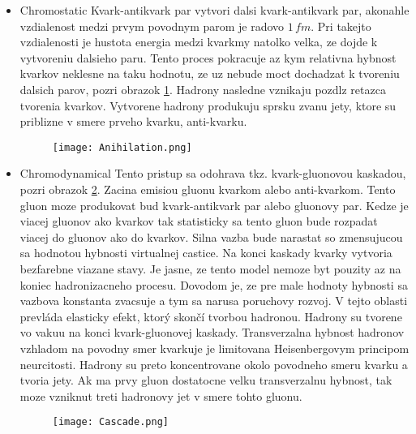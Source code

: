 \documentclass[../../main.tex]{subfiles}
\begin{document}
\begin{itemize}
	\item Chromostatic \newline
	Kvark-antikvark par vytvori dalsi kvark-antikvark par, akonahle vzdialenost medzi prvym povodnym parom je radovo $1\,fm$. Pri takejto vzdialenosti je hustota energia medzi kvarkmy natolko velka, ze dojde k vytvoreniu dalsieho paru. Tento proces pokracuje az kym relativna hybnost kvarkov neklesne na taku hodnotu, ze uz nebude moct dochadzat k tvoreniu dalsich parov, pozri obrazok \ref{sf1:fig:anihilation}. Hadrony nasledne vznikaju pozdlz retazca tvorenia kvarkov. Vytvorene hadrony produkuju sprsku zvanu jety, ktore su priblizne v smere prveho kvarku, anti-kvarku.
	\begin{figure}[!h]
	\centering
	\texttt{[image: Anihilation.png]}
	\caption{}
	\label{sf1:fig:anihilation}
	\end{figure}
	\item Chromodynamical \newline
	Tento pristup sa odohrava tkz. kvark-gluonovou kaskadou, pozri obrazok \ref{sf1:fig:cascade}. Zacina emisiou gluonu kvarkom alebo anti-kvarkom. Tento gluon moze produkovat bud kvark-antikvark par alebo gluonovy par. Kedze je viacej gluonov ako kvarkov tak statisticky sa tento gluon bude rozpadat viacej do gluonov ako do kvarkov. Silna vazba bude narastat so zmensujucou sa hodnotou hybnosti virtualnej castice. Na konci kaskady kvarky vytvoria bezfarebne viazane stavy. Je jasne, ze tento model nemoze byt pouzity az na koniec hadronizacneho procesu. Dovodom je, ze pre male hodnoty hybnosti sa vazbova konstanta zvacsuje a tym sa narusa poruchovy rozvoj. V tejto oblasti prevláda elasticky efekt, ktorý skončí tvorbou hadronou. Hadrony su tvorene vo vakuu na konci kvark-gluonovej kaskady. Transverzalna hybnost hadronov vzhladom na povodny smer kvarkuje je limitovana Heisenbergovym principom neurcitosti. Hadrony su preto koncentrovane okolo povodneho smeru kvarku a tvoria jety. Ak ma prvy gluon dostatocne velku transverzalnu hybnost, tak moze vzniknut treti hadronovy jet v smere tohto gluonu.
	\begin{figure}[!h]
	\centering
	\texttt{[image: Cascade.png]}
	\caption{}
	\label{sf1:fig:cascade}
	\end{figure}
\end{itemize}
\par
\end{document}
